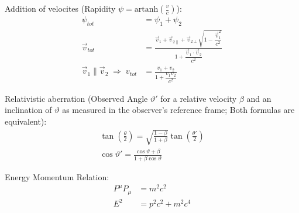 			\noindent
			Addition of velocites (Rapidity $\psi = \mathrm{artanh}\left(\frac{v}{c}\right)$):
			\begin{equation}
				\begin{aligned}
					\psi_{tot} &= \psi_1+\psi_2 \\
					\vec{v}_{tot} &= \frac{\vec{v}_1+\vec{v}_{2\parallel}+\vec{v}_{2\perp}\sqrt{1-\dfrac{\vec{v}_1^2}{c^2}}}{1+\dfrac{\vec{v}_1\cdot\vec{v}_2}{c^2}} \\
					\vec{v}_1\parallel\vec{v}_2 \;\Rightarrow\; v_{tot} &= \frac{v_1+v_2}{1+\dfrac{v_1 v_2}{c^2}}
				\end{aligned}
			\end{equation}

			\noindent
			Relativistic aberration (Observed Angle $\vartheta'$ for a relative velocity $\beta$ and an inclination of $\vartheta$ as measured in the observer's reference frame; Both formulas are equivalent):
			\begin{equation}
				\begin{aligned}
					\tan\left(\frac{\theta}{2}\right) = \sqrt{\frac{1-\beta}{1+\beta}}\tan\left(\frac{\theta'}{2}\right)\\
					\cos\vartheta' = \frac{\cos\vartheta+\beta}{1+\beta\cos\vartheta}
				\end{aligned}
			\end{equation}

			\noindent
			Energy Momentum Relation:
			\begin{equation}
				\begin{aligned}
					P^\mu P_\mu &= m^2 c^2\\
					E^2 &= p^2 c^2 + m^2 c^4 \\
				\end{aligned}
			\end{equation}
			\newpage
